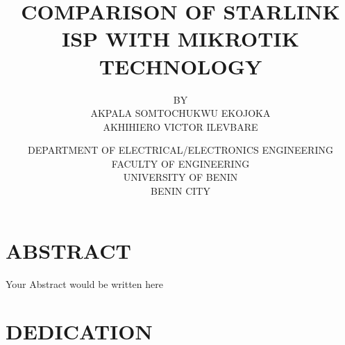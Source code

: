 \documentclass[a4paper, 12pt]{report}
\title{COMPARISON OF STARLINK ISP WITH MIKROTIK TECHNOLOGY}
\author{BY \\
		AKPALA SOMTOCHUKWU EKOJOKA\\
		AKHIHIERO VICTOR ILEVBARE}
\date{DEPARTMENT OF ELECTRICAL/ELECTRONICS ENGINEERING\\
FACULTY OF ENGINEERING\\
UNIVERSITY OF BENIN\\
BENIN CITY}
\begin{document}
\maketitle
\chapter*{ABSTRACT}
Your Abstract would be written here
\chapter*{DEDICATION}
\begin{doublespacing}

\end{doublespacing}


\end{document}
